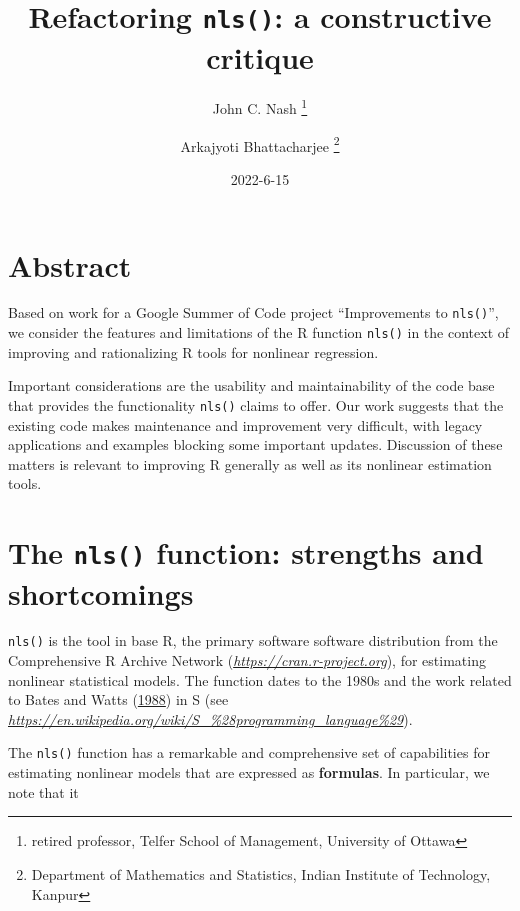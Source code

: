 \documentclass[
]{article}
\title{Refactoring \texttt{nls()}: a constructive critique}
\author{John C. Nash
\thanks{ retired professor, Telfer School of Management, University of Ottawa} \and Arkajyoti
Bhattacharjee
\thanks{Department of Mathematics and Statistics, Indian Institute of Technology, Kanpur}}
\date{2022-6-15}
\begin{document}
\maketitle

{
\hypersetup{linkcolor=}
\setcounter{tocdepth}{2}
\tableofcontents
}
\hypertarget{abstract}{%
\section{Abstract}\label{abstract}}

Based on work for a Google Summer of Code project ``Improvements to
\texttt{nls()}'', we consider the features and limitations of the R
function \texttt{nls()} in the context of improving and rationalizing R
tools for nonlinear regression.

Important considerations are the usability and maintainability of the
code base that provides the functionality \texttt{nls()} claims to
offer. Our work suggests that the existing code makes maintenance and
improvement very difficult, with legacy applications and examples
blocking some important updates. Discussion of these matters is relevant
to improving R generally as well as its nonlinear estimation tools.

\hypertarget{the-nls-function-strengths-and-shortcomings}{%
\section{\texorpdfstring{The \texttt{nls()} function: strengths and
shortcomings}{The nls() function: strengths and shortcomings}}\label{the-nls-function-strengths-and-shortcomings}}

\texttt{nls()} is the tool in base R, the primary software software
distribution from the Comprehensive R Archive Network
(\emph{\url{https://cran.r-project.org}}), for estimating nonlinear
statistical models. The function dates to the 1980s and the work related
to Bates and Watts (\protect\hyperlink{ref-bateswatts}{1988}) in S (see
\emph{\url{https://en.wikipedia.org/wiki/S_\%28programming_language\%29}}).

The \texttt{nls()} function has a remarkable and comprehensive set of
capabilities for estimating nonlinear models that are expressed as
\textbf{formulas}. In particular, we note that it
\end{document}
